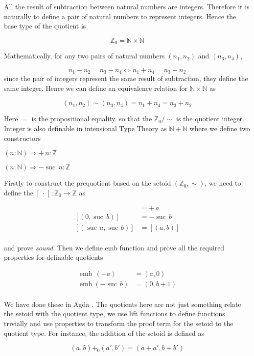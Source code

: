 \documentclass[envcountsame]{llncs}
\newcommand{\N}{\mathbb{N}}
\newcommand{\Z}{\mathbb{Z}}
\newcommand{\dotph}{\,\cdot\,}
\providecommand{\class}[1]{[#1]}
\DeclareMathOperator{\emb}{emb}
\DeclareMathOperator{\suc}{suc\,}
\renewcommand{\equiv}{=}
\begin{document}
All the result of subtraction between natural numbers are integers. Therefore it is naturally to define a pair of
natural numbers to represent integers. Hence the base type of the quotient is

$$\Z_0=\N \times \N$$

Mathematically, for any two pairs of natural numbers $(n_1, n_2)$ and $(n_3, n_4)$, 

$$ n_1 - n_2 = n_3 - n_4\iff n_1 + n_4 = n_3 + n_2$$
since the pair of integers represent the same result of subtraction, they define the same integer. Hence we can define an equivalence relation for $\N \times \N$ as

\[ (n_1, n_2) \sim (n_3, n_4) = n_1 + n_4 \equiv n_3 + n_2 
 \]


Here $\equiv$ is the propositional equality. so that the $\Z_0/\sim$ is the quotient integer.
Integer is also definable in intensional Type Theory as $\N+\N$ where we define two constructors

$ (n \colon \N) \Rightarrow + \,n \colon\Z$

$ (n \colon \N) \Rightarrow -\suc n \colon\Z$


Firstly to construct the prequotient based on the setoid $(\Z_0,\sim)$, we need to define the $\class\dotph \colon \Z_0 \to \Z$ as

\begin{align*}
\class{(a,0)} &= +\,a\\
\class{(0,\suc b)} &= -\suc b\\
\class{(\suc a,\suc b)} &= \class{(a,b)}\\
\end{align*}

and prove \emph{sound}. Then we define emb function and prove all the required properties for definable quotients


\begin{align*}
\emb \,(+ a) &= (a,0)\\
\emb (-\suc b) &= (0,b+1)\\
\end{align*}

We have done these in Agda \cite{nuo:10}. The quotients here are not just something relate the setoid with the quotient type, we use lift functions to define functions trivially and use properties to transform the proof term for the setoid to the quotient type. For instance, the addition of the setoid is defined as

$$(a,b){+_0}(a', b')= (a+a',b+b')$$
\end{document}
